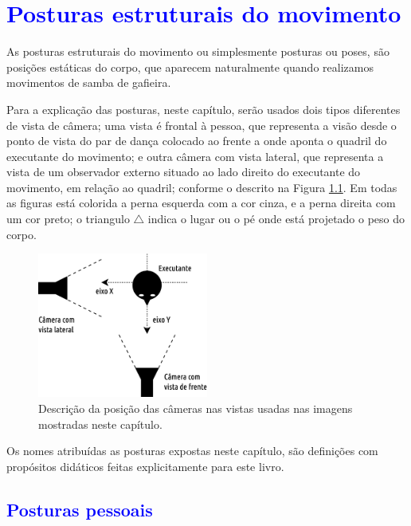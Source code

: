 \chapter{\textcolor{blue}{Posturas estruturais do movimento}}
As posturas estruturais do movimento ou simplesmente posturas ou poses, 
são posições estáticas do corpo, 
que aparecem naturalmente quando realizamos movimentos de samba de gafieira.
 

Para a explicação das posturas, neste capítulo, serão usados dois tipos diferentes de vista de câmera;
uma vista é frontal à pessoa, 
que representa a visão desde o ponto de vista do par de dança colocado ao frente a onde aponta o quadril do executante do movimento; 
e outra câmera com vista lateral, 
que representa a vista de um observador externo situado ao lado direito do executante do movimento, em relação ao quadril; 
conforme o descrito na Figura \ref{fig:vistacamera}.
Em todas as figuras está colorida a perna esquerda com a cor cinza, e a perna direita com um cor preto;
o triangulo $\triangle$ indica o lugar ou o pé onde está projetado o peso do corpo.
\begin{figure}[h]
  \centering
    \includegraphics[width=0.5\textwidth]{chapters/cap-posturas/vistas.eps}
  \caption{Descrição da posição das câmeras nas vistas usadas nas imagens mostradas neste capítulo.}
  \label{fig:vistacamera}
\end{figure}

\begin{remark}
 Os nomes atribuídas as posturas expostas neste capítulo, 
 são definições com propósitos didáticos feitas explicitamente para este livro.
\end{remark}


\section{\textcolor{blue}{Posturas pessoais}}



